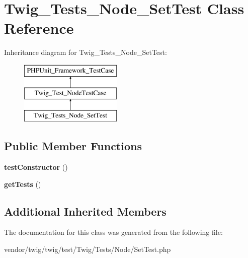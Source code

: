 \hypertarget{classTwig__Tests__Node__SetTest}{}\section{Twig\+\_\+\+Tests\+\_\+\+Node\+\_\+\+Set\+Test Class Reference}
\label{classTwig__Tests__Node__SetTest}
Inheritance diagram for Twig\+\_\+\+Tests\+\_\+\+Node\+\_\+\+Set\+Test\+:\begin{figure}[H]
\begin{center}
\leavevmode
\includegraphics[height=3.000000cm]{classTwig__Tests__Node__SetTest}
\end{center}
\end{figure}
\subsection*{Public Member Functions}
\begin{DoxyCompactItemize}
\item 
{\bfseries test\+Constructor} ()\hypertarget{classTwig__Tests__Node__SetTest_a4cd53ccdc1e9c2e33ce765b709229ce7}{}\label{classTwig__Tests__Node__SetTest_a4cd53ccdc1e9c2e33ce765b709229ce7}

\item 
{\bfseries get\+Tests} ()\hypertarget{classTwig__Tests__Node__SetTest_afa1300a5e6b62eefd394afb28fcb15d0}{}\label{classTwig__Tests__Node__SetTest_afa1300a5e6b62eefd394afb28fcb15d0}

\end{DoxyCompactItemize}
\subsection*{Additional Inherited Members}


The documentation for this class was generated from the following file\+:\begin{DoxyCompactItemize}
\item 
vendor/twig/twig/test/\+Twig/\+Tests/\+Node/Set\+Test.\+php\end{DoxyCompactItemize}
